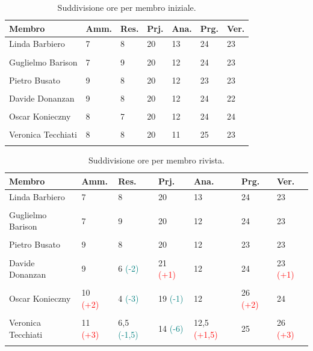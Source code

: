\documentclass[8pt]{article}
\begin{document}
\begin{table}[H]   
	\centering
	\begin{tabular}{C{3cm} C{1cm} C{1cm} C{1cm} C{1cm} C{1cm} C{1cm}}
		\toprule
		\textbf{Membro} & 
		\textbf{Amm.} & 
		\textbf{Res.} & 
		\textbf{Prj.} &
		\textbf{Ana.} &
		\textbf{Prg.} &
		\textbf{Ver.}\\
		\midrule
		Linda Barbiero & 7 & 8  & 20  & 13 & 24  & 23 \\\\ 
		Guglielmo Barison & 7 & 9 & 20 & 12 & 24 & 23 \\\\ 
		Pietro Busato & 9 & 8 & 20 & 12 & 23 & 23 \\\\ 
		Davide Donanzan & 9 & 8 & 20 & 12 & 24 & 22 \\\\ 
		Oscar Konieczny & 8 & 7 & 20 & 12 & 24 & 24 \\\\ 
		Veronica Tecchiati & 8 & 8 & 20 & 11 & 25 & 23 \\\\ 
		\bottomrule
	\end{tabular}
	\caption{Suddivisione ore per membro iniziale.}
	\label{table:suddivisioneRuoliMembriIniziale}
\end{table}
\begin{table}[H]   
	\centering
	\begin{tabular}{C{3cm} C{1.5cm} C{1.5cm} C{1.5cm} C{2cm} C{1.5cm} C{1.5cm}}
		\toprule
		\textbf{Membro} & 
		\textbf{Amm.} & 
		\textbf{Res.} & 
		\textbf{Prj.} &
		\textbf{Ana.} &
		\textbf{Prg.} &
		\textbf{Ver.}\\
		\midrule
		Linda Barbiero & 7 & 8  & 20  & 13 & 24  & 23 \\\\ 
		Guglielmo Barison & 7 & 9 & 20 & 12 & 24 & 23 \\\\ 
		Pietro Busato & 9 & 8 & 20 & 12 & 23 & 23 \\\\ 
		Davide Donanzan & 9 & 6 \textcolor{teal}{(-2)} & 21 \textcolor{red}{(+1)} & 12 & 24 & 23 \textcolor{red}{(+1)} \\\\ 
		Oscar Konieczny & 10 \textcolor{red}{(+2)} & 4 \textcolor{teal}{(-3)} & 19 \textcolor{teal}{(-1)} & 12 & 26 \textcolor{red}{(+2)} & 24 \\\\ 
		Veronica Tecchiati & 11 \textcolor{red}{(+3)} & 6,5 \textcolor{teal}{(-1,5)} & 14 \textcolor{teal}{(-6)} & 12,5 \textcolor{red}{(+1,5)} & 25 & 26 \textcolor{red}{(+3)} \\\\ 
		\bottomrule
	\end{tabular}
	\caption{Suddivisione ore per membro rivista.}
	\label{table:suddivisioneRuoliMembriRivista}
\end{table}
\end{document}
